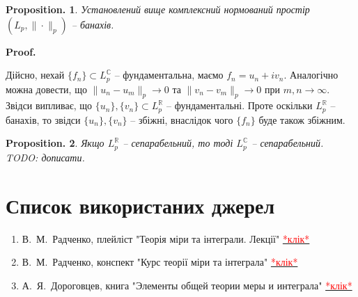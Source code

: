 \documentclass[a4paper, 10pt]{article}
\makeatletter
\theoremstyle{theoremdd}
\newtheorem*{proposition*}{Proposition.}
\renewenvironment{proof}[1][Proof.\\]{\par
\pushQED{\hfill \qed}%
\normalfont \topsep6\p@\@plus6\p@\relax
\trivlist
\item\relax
{\bfseries
#1\@addpunct{.}}\hspace\labelsep\ignorespaces
}{%
\popQED\endtrivlist\@endpefalse
}
\makeatother
\begin{document}
\begin{proposition*}
Установлений вище комплексний нормований простір $(L_p, \| \cdot \|_p)$ -- банахів.
\end{proposition*}

\begin{proof}
Дійсно, нехай $\{f_n\} \subset L_p^{\mathbb{C}}$ -- фундаментальна, маємо $f_n = u_n + i v_n$. Аналогічно можна довести, що $\| u_n - u_m \|_p \to 0$ та $\| v_n - v_m \|_p \to 0$ при $m,n \to \infty$. Звідси випливає, що $\{u_n\}, \{v_n\} \subset L_p^{\mathbb{R}}$ -- фундаментальні. Проте оскільки $L_p^{\mathbb{R}}$ -- банахів, то звідси $\{u_n\}, \{v_n\}$ -- збіжні, внаслідок чого $\{f_n\}$ буде також збіжним.
\end{proof}

\begin{proposition*}
Якщо $L_p^{\mathbb{R}}$ -- сепарабельний, то тоді $L_p^{\mathbb{C}}$ -- сепарабельний.\\
\textit{TODO: дописати.}
\end{proposition*}


\newpage
\thispagestyle{empty}
\section*{Список використаних джерел}
\begin{enumerate}[wide=0pt]
\item В.\ М.\ Радченко, плейліст "Теорія міри та інтеграли. Лекції" \quad \href{https://www.youtube.com/@vadymradchenko8925/playlists}{\textcolor{red}{*клік*}}
\item В.\ М.\ Радченко, конспект "Курс теорії міри та інтеграла" \qquad \href{https://mechmat.knu.ua/wp-content/uploads/2018/08/measuretheoryradchenko_a4_2018.pdf}{\textcolor{red}{*клік*}}
\item А.\ Я.\ Дороговцев, книга "Элементы общей теории меры и интеграла" \quad \href{https://www.slideshare.net/YuriyMaturin/ss-58815473}{\textcolor{red}{*клік*}}
\end{enumerate}
\end{document}
